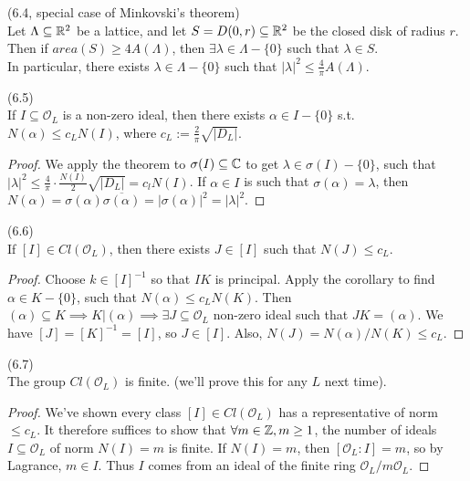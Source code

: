 \documentclass[a4paper]{article}
\begin{document}
\begin{thm} (6.4, special case of Minkovski's theorem)\\
Let $\Lambda \subseteq \mathbb{R}^2$ be a lattice, and let $S=D(0,r) \subseteq \mathbb{R}^2$ be the closed disk of radius $r$. Then if $area(S) \geq 4A(\Lambda)$, then $\exists \lambda \in \Lambda - \{0\}$ such that $\lambda \in S$.\\
In particular, there exists $\lambda \in \Lambda - \{0\}$ such that $|\lambda|^2 \leq \frac{4}{\pi} A(\Lambda)$.
\end{thm}

\begin{coro} (6.5)\\
If $I \subseteq \mathcal{O}_L$ is a non-zero ideal, then there exists $\alpha \in I-\{0\}$ s.t. $N(\alpha) \leq c_LN(I)$, where $c_L := \frac{2}{\pi} \sqrt{|D_L|}$.
\begin{proof}
We apply the theorem to $\sigma(I) \subseteq \mathbb{C}$ to get $\lambda \in \sigma(I) - \{0\}$, such that $|\lambda|^2 \leq \frac{4}{\pi} \cdot \frac{N(I)}{2} \sqrt{|D_L|} = c_l N(I)$. If $\alpha \in I$ is such that $\sigma(\alpha) = \lambda$, then $N(\alpha) = \sigma(\alpha) \overline{\sigma(\alpha)} = |\sigma(\alpha)|^2 = |\lambda|^2$.
\end{proof}
\end{coro}

\begin{coro} (6.6)\\
If $[I] \in Cl(\mathcal{O}_L)$, then there exists $J \in [I]$ such that $N(J) \leq c_L$.
\begin{proof}
Choose $k \in [I]^{-1}$ so that $IK$ is principal. Apply the corollary to find $\alpha \in K-\{0\}$, such that $N(\alpha) \leq c_L N(K)$. Then $(\alpha) \subseteq K \implies K | (\alpha) \implies \exists J \subseteq \mathcal{O}_L$ non-zero ideal such that $JK = (\alpha)$. We have $[J] = [K]^{-1} = [I]$, so $J \in [I]$. Also, $N(J) = N(\alpha) / N(K) \leq c_L$.
\end{proof}
\end{coro}

\begin{thm} (6.7)\\
The group $Cl(\mathcal{O}_L)$ is finite. (we'll prove this for any $L$ next time).
\begin{proof}
We've shown every class $[I] \in Cl(\mathcal{O}_L)$ has a representative of norm $\leq c_L$. It therefore suffices to show that $\forall m \in \mathbb{Z}, m \geq 1$, the number of ideals $I \subseteq \mathcal{O}_L$ of norm $N(I) = m$ is finite. If $N(I) = m$, then $[\mathcal{O}_L:I] = m$, so by Lagrance, $m \in I$. Thus $I$ comes from an ideal of the finite ring $\mathcal{O}_L / m\mathcal{O}_L$.
\end{proof}
\end{thm}
\end{document}
